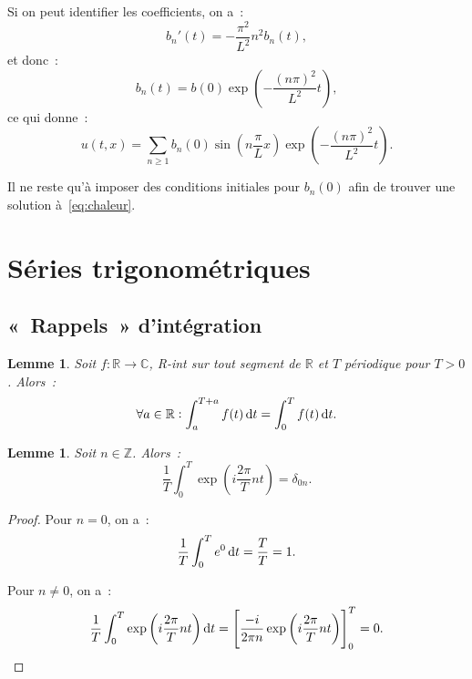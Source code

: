 \documentclass{report}
\newtheorem{lem}[thm]{Lemme}
\theoremstyle{definition}
\theoremstyle{remark}
\numberwithin{equation}{section}
\newcommand{\C}{\mathbb C}
\newcommand{\R}{\mathbb R}
\newcommand{\Z}{\mathbb Z}
\begin{document}
		Si on peut identifier les coefficients, on a~:
		\begin{equation}
			b_n'(t) = -\frac {\pi^2}{L^2}n^2b_n(t),
		\end{equation}
		et donc~:
		\begin{equation}
			b_n(t) = b(0)\exp\left(-\frac {(n\pi)^2}{L^2}t\right),
		\end{equation}
		ce qui donne~:
		\begin{equation}
			u(t, x) = \sum_{n \geq 1}b_n(0)\sin\left(n\frac \pi Lx\right)\exp\left(-\frac {(n\pi)^2}{L^2}t\right).
		\end{equation}

		Il ne reste qu'à imposer des conditions initiales pour $b_n(0)$ afin de trouver une solution à~\eqref{eq:chaleur}.

	\section{Séries trigonométriques}
		\subsection{«~Rappels~» d'intégration}
			\begin{lem} Soit $f : \R \to \C$, R-int sur tout segment de $\R$ et $T$ périodique pour $T > 0$. Alors~:
			\begin{equation}
				\forall a \in \R : \int_a^{T+a}f(t)\dif t = \int_0^Tf(t)\dif t.
			\end{equation}
			\end{lem}

			\begin{lem} Soit $n \in \Z$. Alors~:
			\begin{equation}\label{eq:int exp(int) = delta n0}
				\frac 1T\int_0^T\exp\left(i\frac {2\pi}Tnt\right) = \delta_{0n}.
			\end{equation}
			\end{lem}

			\begin{proof} Pour $n = 0$, on a~:
			\begin{equation}
				\frac 1T\int_0^Te^0\dif t = \frac TT = 1.
			\end{equation}

			Pour $n \neq 0$, on a~:
			\begin{equation}
			\frac 1T\int_0^T\exp\left(i\frac {2\pi}Tnt\right)\dif t = \left[\frac {-i}{2\pi n}\exp\left(i\frac {2\pi}Tnt\right)\right]_0^T = 0.
			\end{equation}
			\end{proof}
\end{document}
